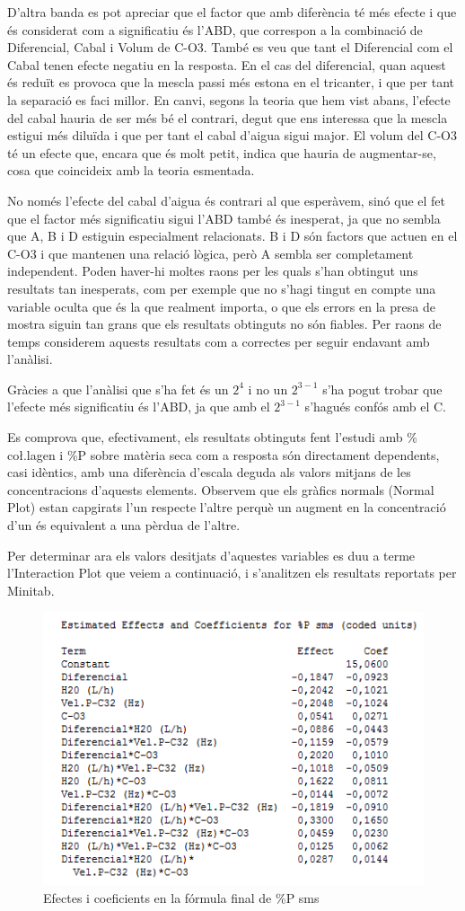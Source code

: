 \documentclass[a4paper]{article}
\begin{document}
D’altra banda es pot apreciar que el factor que amb diferència té més efecte i que és considerat com a significatiu és l’ABD, que correspon a la combinació de Diferencial, Cabal i Volum de C-O3. També es veu que tant el Diferencial com el Cabal tenen efecte negatiu en la resposta. En el cas del diferencial, quan aquest és reduït es provoca que la mescla passi més estona en el tricanter, i que per tant la separació es faci millor. En canvi, segons la teoria que hem vist abans, l'efecte del cabal hauria de ser més bé el contrari, degut que ens interessa que la mescla estigui més diluïda i que per tant el cabal d'aigua sigui major. El volum del C-O3 té un efecte que, encara que és molt petit, indica que hauria de augmentar-se, cosa que coincideix amb la teoria esmentada.

No només l'efecte del cabal d'aigua és contrari al que esperàvem, sinó que el fet que el factor més significatiu sigui l'ABD també és inesperat, ja que no sembla que A, B i D estiguin especialment relacionats. B i D són factors que actuen en el C-O3 i que mantenen una relació lògica, però A sembla ser completament independent. Poden haver-hi moltes raons per les quals s'han obtingut uns resultats tan inesperats, com per exemple que no s'hagi tingut en compte una variable oculta que és la que realment importa, o que els errors en la presa de mostra siguin tan grans que els resultats obtinguts no són fiables. Per raons de temps considerem aquests resultats com a correctes per seguir endavant amb l'anàlisi.

Gràcies a que l'anàlisi que s'ha fet és un $2^4$ i no un $2^{3-1}$ s'ha pogut trobar que l'efecte més significatiu és l'ABD, ja que amb el $2^{3-1}$ s'hagués confós amb el C. 

Es comprova que, efectivament, els resultats obtinguts fent l’estudi amb \% co\l.lagen i \%P sobre matèria seca com a resposta són directament dependents, casi idèntics, amb una diferència d’escala deguda als valors mitjans de les concentracions d’aquests elements. Observem que els gràfics normals (Normal Plot) estan capgirats l'un respecte l'altre perquè un augment en la concentració d'un és equivalent a una pèrdua de l'altre.
 
Per determinar ara els valors desitjats d’aquestes variables es duu a terme l’Interaction Plot que veiem a continuació, i s’analitzen els resultats reportats per Minitab.

\begin{figure}[H]
	\centering
	\includegraphics[width=.5\textwidth]{images/Coefs}
	\caption{Efectes i coeficients en la fórmula final de \%P sms}
	\label{fig:Coefs}
\end{figure} 	
\end{document}
